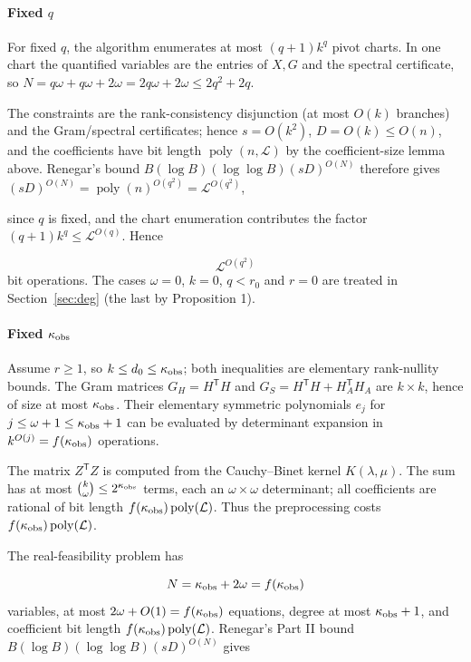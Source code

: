 \documentclass[journal]{IEEEtran}
\theoremstyle{plainn}
\theoremstyle{remark}
\begin{document}
\paragraph*{Fixed $q$}
For fixed $q$, the algorithm enumerates at most $(q+1)k^q$ pivot charts. In one chart the quantified variables are the entries of $X,G$ and the spectral certificate, so $N=q\omega+q\omega+2\omega=2q\omega+2\omega\le2q^2+2q$.

The constraints are the rank-consistency disjunction (at most $O(k)$ branches) and the Gram/spectral certificates; hence $s=O(k^2)$, $D=O(k)\le O(n)$, and the coefficients have bit length $\operatorname{poly}(n,\mathcal L)$ by the coefficient-size lemma above. Renegar's bound $B(\log B)(\log\log B)(sD)^{O(N)}$ therefore gives $(sD)^{O(N)}=\operatorname{poly}(n)^{O(q^2)}=\mathcal L^{O(q^2)}$,

since $q$ is fixed, and the chart enumeration contributes the factor $(q+1)k^q\le\mathcal L^{O(q)}$. Hence

\begin{equation}
\mathcal L^{O(q^2)}
\end{equation}
bit operations. The cases $\omega=0$, $k=0$, $q<r_0$ and $r=0$ are treated in Section~\ref{sec:deg} (the last by Proposition 1).

\paragraph*{Fixed $\kappa_{\rm obs}$}
Assume $r\ge1$, so $k\le d_0\le\kappa_{\rm obs}$; both inequalities are elementary rank-nullity bounds. The Gram matrices $G_H=H^{\mathsf T}H$ and $G_S=H^{\mathsf T}H+H_A^{\mathsf T}H_A$ are $k\times k$, hence of size at most $\kappa_{\rm obs}$. Their elementary symmetric polynomials $e_j$ for $j\le\omega+1\le\kappa_{\rm obs}+1$ can be evaluated by determinant expansion in $k^{O(j)}=f(\kappa_{\rm obs})$ operations.

The matrix $Z^{\mathsf T}Z$ is computed from the Cauchy--Binet kernel $K(\lambda,\mu)$. The sum has at most $\binom{k}{\omega}\le2^{\kappa_{\rm obs}}$ terms, each an $\omega\times \omega$ determinant; all coefficients are rational of bit length $f(\kappa_{\rm obs})\operatorname{poly}(\mathcal L)$. Thus the preprocessing costs $f(\kappa_{\rm obs})\operatorname{poly}(\mathcal L)$.

The real-feasibility problem has

\begin{equation}
N=\kappa_{\rm obs}+2\omega=f(\kappa_{\rm obs})
\end{equation}
variables, at most $2\omega+O(1)=f(\kappa_{\rm obs})$ equations, degree at most $\kappa_{\rm obs}+1$, and coefficient bit length $f(\kappa_{\rm obs})\operatorname{poly}(\mathcal L)$. Renegar's Part II bound $B(\log B)(\log\log B)(sD)^{O(N)}$ gives
\end{document}
